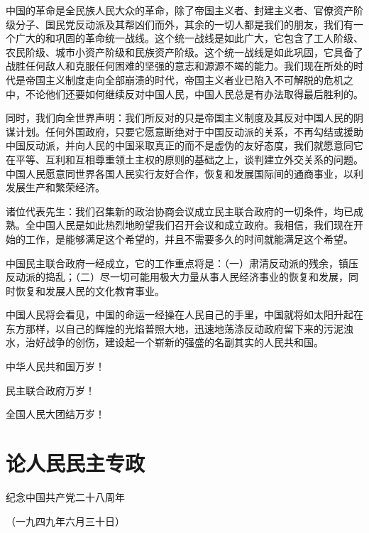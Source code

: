 \documentclass[UTF-8, a5paper, 12pt]{ctexart}
\begin{document}
中国的革命是全民族人民大众的革命，除了帝国主义者、封建主义者、官僚资产阶级分子、国民党反动派及其帮凶们而外，其余的一切人都是我们的朋友，我们有一个广大的和巩固的革命统一战线。这个统一战线是如此广大，它包含了工人阶级、农民阶级、城市小资产阶级和民族资产阶级。这个统一战线是如此巩固，它具备了战胜任何敌人和克服任何困难的坚强的意志和源源不竭的能力。我们现在所处的时代是帝国主义制度走向全部崩溃的时代，帝国主义者业已陷入不可解脱的危机之中，不论他们还要如何继续反对中国人民，中国人民总是有办法取得最后胜利的。

同时，我们向全世界声明：我们所反对的只是帝国主义制度及其反对中国人民的阴谋计划。任何外国政府，只要它愿意断绝对于中国反动派的关系，不再勾结或援助中国反动派，并向人民的中国采取真正的而不是虚伪的友好态度，我们就愿意同它在平等、互利和互相尊重领土主权的原则的基础之上，谈判建立外交关系的问题。中国人民愿意同世界各国人民实行友好合作，恢复和发展国际间的通商事业，以利发展生产和繁荣经济。

诸位代表先生：我们召集新的政治协商会议成立民主联合政府的一切条件，均已成熟。全中国人民是如此热烈地盼望我们召开会议和成立政府。我相信，我们现在开始的工作，是能够满足这个希望的，并且不需要多久的时间就能满足这个希望。

中国民主联合政府一经成立，它的工作重点将是：（一）肃清反动派的残余，镇压反动派的捣乱；（二）尽一切可能用极大力量从事人民经济事业的恢复和发展，同时恢复和发展人民的文化教育事业。

中国人民将会看见，中国的命运一经操在人民自己的手里，中国就将如太阳升起在东方那样，以自己的辉煌的光焰普照大地，迅速地荡涤反动政府留下来的污泥浊水，治好战争的创伤，建设起一个崭新的强盛的名副其实的人民共和国。

中华人民共和国万岁！

民主联合政府万岁！

全国人民大团结万岁！

\section{论人民民主专政}

纪念中国共产党二十八周年

（一九四九年六月三十日）
\end{document}
